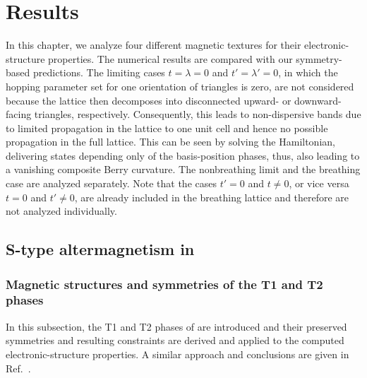 \chapter{Results}
\label{chapter:Results}
In this chapter, we analyze four different magnetic textures for their electronic-structure properties. The numerical results are compared with our symmetry-based predictions. The limiting cases $t=\lambda=0$ and $t'=\lambda'=0$, in which the hopping parameter set for one orientation of triangles is zero, are not considered because the lattice then decomposes into disconnected upward- or downward-facing triangles, respectively. Consequently, this leads to non-dispersive bands due to limited propagation in the lattice to one unit cell and hence no possible propagation in the full lattice. This can be seen by solving the Hamiltonian, delivering states depending only of the basis-position phases, thus, also leading to a vanishing composite Berry curvature.
The nonbreathing limit and the breathing case are analyzed separately. Note that the cases $t'=0$ and $t\neq 0$, or vice versa $t=0$ and $t' \neq 0$, are already included in the breathing lattice and therefore are not analyzed individually.
\section{S-type altermagnetism in }

\subsection{Magnetic structures and symmetries of the T1 and T2 phases}
\label{subsubsec: Mn3Pt magnetic order & symm}

In this subsection, the T1 and T2 phases of  are introduced and their preserved symmetries and resulting constraints are derived and applied to the computed electronic-structure properties. A similar approach and conclusions are given in Ref.~\cite{Quelle3}.


